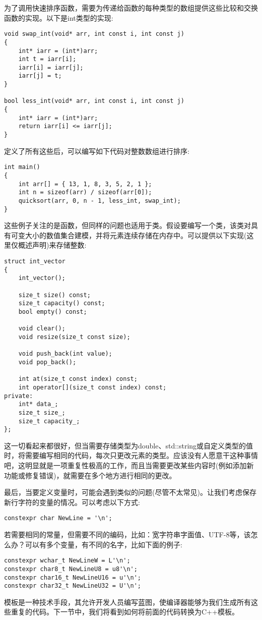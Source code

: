 为了调用快速排序函数，需要为传递给函数的每种类型的数组提供这些比较和交换函数的实现。以下是int类型的实现:

\begin{lstlisting}[style=styleCXX]
void swap_int(void* arr, int const i, int const j)
{
	int* iarr = (int*)arr;
	int t = iarr[i];
	iarr[i] = iarr[j];
	iarr[j] = t;
}

bool less_int(void* arr, int const i, int const j)
{
	int* iarr = (int*)arr;
	return iarr[i] <= iarr[j];
}
\end{lstlisting}

定义了所有这些后，可以编写如下代码对整数数组进行排序:

\begin{lstlisting}[style=styleCXX]
int main()
{
	int arr[] = { 13, 1, 8, 3, 5, 2, 1 };
	int n = sizeof(arr) / sizeof(arr[0]);
	quicksort(arr, 0, n - 1, less_int, swap_int);
}
\end{lstlisting}

这些例子关注的是函数，但同样的问题也适用于类。假设要编写一个类，该类对具有可变大小的数值集合建模，并将元素连续存储在内存中。可以提供以下实现(这里仅概述声明)来存储整数:

\begin{lstlisting}[style=styleCXX]
struct int_vector
{
	int_vector();
	
	size_t size() const;
	size_t capacity() const;
	bool empty() const;
	
	void clear();
	void resize(size_t const size);
	
	void push_back(int value);
	void pop_back();
	
	int at(size_t const index) const;
	int operator[](size_t const index) const;
private:
	int* data_;
	size_t size_;
	size_t capacity_;
};
\end{lstlisting}

这一切看起来都很好，但当需要存储类型为double、std::string或自定义类型的值时，将需要编写相同的代码，每次只更改元素的类型。应该没有人愿意干这种事情吧，这明显就是一项重复性极高的工作，而且当需要更改某些内容时(例如添加新功能或修复错误)，就需要在多个地方进行相同的更改。

最后，当要定义变量时，可能会遇到类似的问题(尽管不太常见)。让我们考虑保存新行字符的变量的情况。可以考虑以下方式:

\begin{lstlisting}[style=styleCXX]
constexpr char NewLine = '\n';
\end{lstlisting}

若需要相同的常量，但需要不同的编码，比如：宽字符串字面值、UTF-8等，该怎么办？可以有多个变量，有不同的名字，比如下面的例子:

\begin{lstlisting}[style=styleCXX]
constexpr wchar_t NewLineW = L'\n';
constexpr char8_t NewLineU8 = u8'\n';
constexpr char16_t NewLineU16 = u'\n';
constexpr char32_t NewLineU32 = U'\n';
\end{lstlisting}

模板是一种技术手段，其允许开发人员编写蓝图，使编译器能够为我们生成所有这些重复的代码。下一节中，我们将看到如何将前面的代码转换为C++模板。







